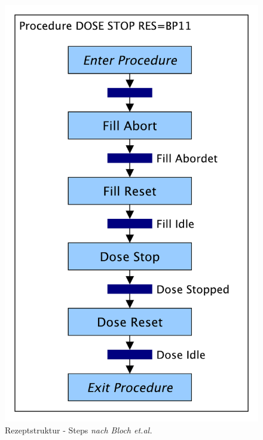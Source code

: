 \begin{figure}[h]
\centering
\includegraphics[scale=0.28]{DA_files/Bilder/Anhang/Steps.pdf}
\caption[Rezeptstruktur modulare Anlage - Steps \textit{nach Bloch et.al.}]{Rezeptstruktur - Steps \textit{nach Bloch et.al.} \citep[53]{Bloch2017}}
\end{figure}

